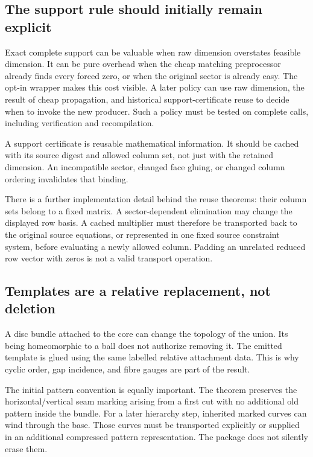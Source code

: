 \documentclass[11pt]{article}
\theoremstyle{definition}
\theoremstyle{remark}
\begin{document}
\subsection{The support rule should initially remain explicit}

Exact complete support can be valuable when raw dimension overstates
feasible dimension. It can be pure overhead when the cheap matching
preprocessor already finds every forced zero, or when the original
sector is already easy. The opt-in wrapper makes this cost visible.
A later policy can use raw dimension, the result of cheap propagation,
and historical support-certificate reuse to decide when to invoke the
new producer. Such a policy must be tested on complete calls, including
verification and recompilation.

A support certificate is reusable mathematical information. It should
be cached with its source digest and allowed column set, not just with
the retained dimension. An incompatible sector, changed face gluing,
or changed column ordering invalidates that binding.

There is a further implementation detail behind the reuse theorems:
their column sets belong to a fixed matrix. A sector-dependent elimination
may change the displayed row basis. A cached multiplier must therefore
be transported back to the original source equations, or represented in
one fixed source constraint system, before evaluating a newly allowed
column. Padding an unrelated reduced row vector with zeros is not a
valid transport operation.

\subsection{Templates are a relative replacement, not deletion}

A disc bundle attached to the core can change the topology of the union.
Its being homeomorphic to a ball does not authorize removing it.
The emitted template is glued using the same labelled relative
attachment data. This is why cyclic order, gap incidence, and fibre
gauges are part of the result.

The initial pattern convention is equally important. The theorem
preserves the horizontal/vertical seam marking arising from a first cut
with no additional old pattern inside the bundle. For a later hierarchy
step, inherited marked curves can wind through the base. Those curves
must be transported explicitly or supplied in an additional compressed
pattern representation. The package does not silently erase them.
\end{document}
